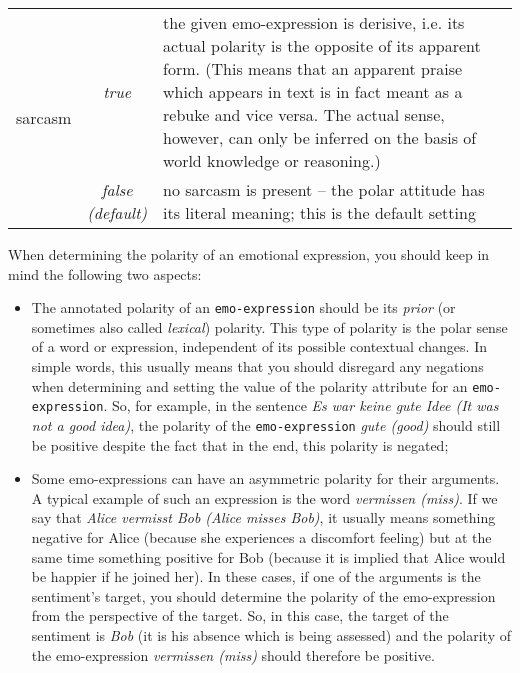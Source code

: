 \documentclass[11pt,a4paper]{article}
\newlength\clmnwidth
\begin{document}
\begin{center}
\begin{tabular}{|l|c|p{\clmnwidth}|}

    \multirow{2}{*}{sarcasm} & \textit{true} & the given emo-expression is
    derisive, i.e. its actual polarity is the opposite of its apparent
    form. (This means that an apparent praise which appears in text is
    in fact meant as a rebuke and vice versa. The actual sense,
    however, can only be inferred on the basis of world knowledge or
    reasoning.)\\\cline{2-3}

    & \textit{false\newline(default)} & no sarcasm is present -- the
    polar attitude has its literal meaning; this is the default
    setting\\\hline
    
\end{tabular}
\end{center}


When determining the polarity of an emotional expression, you should keep in
mind the following two aspects:
\begin{itemize}
  \item The annotated polarity of an \texttt{emo-expression} should be
    its \textit{prior} (or sometimes also called \textit{lexical})
    polarity.  This type of polarity is the polar sense of a word or
    expression, independent of its possible contextual changes.  In
    simple words, this usually means that you should disregard any
    negations when determining and setting the value of the polarity
    attribute for an \texttt{emo-expression}. So, for example, in the
    sentence \textit{Es war keine gute Idee (It was not a good idea)},
    the polarity of the \texttt{emo-expression} \textit{gute (good)}
    should still be positive despite the fact that in the end, this
    polarity is negated;

  \item Some emo-expressions can have an asymmetric polarity for their
    arguments.  A typical example of such an expression is the word
    \textit{vermissen (miss)}.  If we say that \textit{Alice vermisst
      Bob (Alice misses Bob)}, it usually means something negative for
    Alice (because she experiences a discomfort feeling) but at the
    same time something positive for Bob (because it is implied that
    Alice would be happier if he joined her).  In these cases, if one
    of the arguments is the sentiment's target, you should determine
    the polarity of the emo-expression from the perspective of the
    target.  So, in this case, the target of the sentiment is
    \textit{Bob} (it is his absence which is being assessed) and the
    polarity of the emo-expression \textit{vermissen (miss)} should
    therefore be positive.
\end{itemize}
\end{document}
